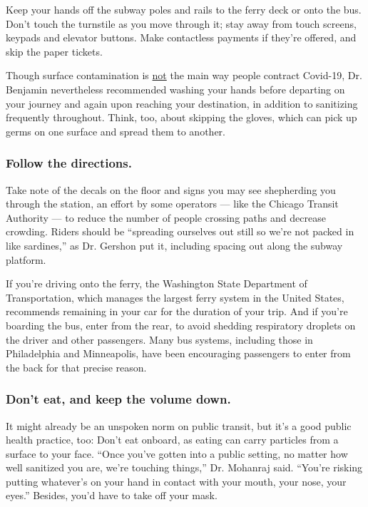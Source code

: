 Keep your hands off the subway poles and rails to the ferry deck or onto
the bus. Don't touch the turnstile as you move through it; stay away
from touch screens, keypads and elevator buttons. Make contactless
payments if they're offered, and skip the paper tickets.

Though surface contamination is
\href{https://www.nytimes3xbfgragh.onion/2020/05/22/health/cdc-coronavirus-touching-surfaces.html}{not}
the main way people contract Covid-19, Dr. Benjamin nevertheless
recommended washing your hands before departing on your journey and
again upon reaching your destination, in addition to sanitizing
frequently throughout. Think, too, about skipping the gloves, which can
pick up germs on one surface and spread them to another.

\hypertarget{follow-the-directions}{%
\subsubsection{Follow the directions.}\label{follow-the-directions}}

Take note of the decals on the floor and signs you may see shepherding
you through the station, an effort by some operators --- like the
Chicago Transit Authority --- to reduce the number of people crossing
paths and decrease crowding. Riders should be ``spreading ourselves out
still so we're not packed in like sardines,'' as Dr. Gershon put it,
including spacing out along the subway platform.

If you're driving onto the ferry, the Washington State Department of
Transportation, which manages the largest ferry system in the United
States, recommends remaining in your car for the duration of your trip.
And if you're boarding the bus, enter from the rear, to avoid shedding
respiratory droplets on the driver and other passengers. Many bus
systems, including those in Philadelphia and Minneapolis, have been
encouraging passengers to enter from the back for that precise reason.

\hypertarget{dont-eat-and-keep-the-volume-down}{%
\subsubsection{Don't eat, and keep the volume
down.}\label{dont-eat-and-keep-the-volume-down}}

It might already be an unspoken norm on public transit, but it's a good
public health practice, too: Don't eat onboard, as eating can carry
particles from a surface to your face. ``Once you've gotten into a
public setting, no matter how well sanitized you are, we're touching
things,'' Dr. Mohanraj said. ``You're risking putting whatever's on your
hand in contact with your mouth, your nose, your eyes.'' Besides, you'd
have to take off your mask.

